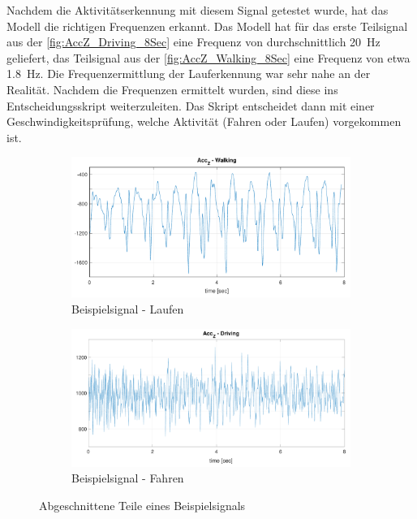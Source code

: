Nachdem die Aktivitätserkennung mit diesem Signal getestet wurde, hat das Modell die richtigen Frequenzen erkannt.
Das Modell hat für das erste Teilsignal aus der \autoref{fig:AccZ_Driving_8Sec} eine Frequenz von durchschnittlich \SI{20}{\hertz} geliefert, das Teilsignal aus der \autoref{fig:AccZ_Walking_8Sec} eine Frequenz von etwa \SI{1,8}{\hertz}. Die Frequenzermittlung der Lauferkennung war sehr nahe an der Realität.
Nachdem die Frequenzen ermittelt wurden, sind diese ins Entscheidungsskript weiterzuleiten. Das Skript entscheidet dann mit einer Geschwindigkeitsprüfung, welche Aktivität (Fahren oder Laufen) vorgekommen ist.


\begin{figure}
	\centering
	\begin{subfigure}{\textwidth}
		\centering
		\includegraphics[width=\textwidth]{Bilder/AccZ_Walking_8Sec_mat_2.pdf}
		\caption{Beispielsignal - Laufen}
		\label{fig:AccZ_Driving_8Sec}
	\end{subfigure}
	\hfill
	\begin{subfigure}{\textwidth}
		\centering
		\includegraphics[width=\textwidth]{Bilder/AccZ_Driving_8Sec_mat1_2.pdf} 
		\caption{Beispielsignal - Fahren}
		\label{fig:AccZ_Walking_8Sec}
	\end{subfigure}
	\caption{Abgeschnittene Teile eines Beispielsignals}
	\label{fig:AbschnitteBeispielsignal}
\end{figure}

